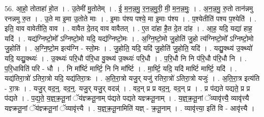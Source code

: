 \documentclass[17pt]{extarticle}
\begin{document}
56. आ॒हो॒ तोताहा॑ हो॒त । . उ॒तेमी॑ मु॒तोतेम् । . ई॒ म॒न॒न्न॒मु॒ र॒न॒न्न॒मु॒री॒ मी॒ म॒न॒न्न॒मुः॒ । . अ॒न॒न्न॒मु॒ रु॒तो तान॑न्नमु रनन्नमु रु॒त । . उ॒ते मा इ॒मा उ॒तोते माः । . इ॒माः प॑श्य पश्ये॒ मा इ॒माः प॑श्य । . प॒श्येतीति॑ पश्य प॒श्येति॑ । . इति॒ वाव वावेतीति॒ वाव । . वावैत दे॒तद् वाव वावैतत् । . ए॒त दा॑हा है॒त दे॒त दा॑ह । . आ॒ह॒ यदि॒ यद्या॑ हाह॒ यदि॑ । . यद्य॑ग्निष्टो॒मो᳚ ऽग्निष्टो॒मो यदि॒ यद्य॑ग्निष्टो॒मः । . अ॒ग्नि॒ष्टो॒मो जु॒होति॑ जु॒हो त्य॑ग्निष्टो॒मो᳚ ऽग्निष्टो॒मो जु॒होति॑ । . अ॒ग्नि॒ष्टो॒म इत्य॑ग्नि - स्तो॒मः । . जु॒होति॒ यदि॒ यदि॑ जु॒होति॑ जु॒होति॒ यदि॑ । . यद्यु॒क्थ्य॑ उ॒क्थ्यो॑ यदि॒ यद्यु॒क्थ्यः॑ । . उ॒क्थ्यः॑ परि॒धौ प॑रि॒धा वु॒क्थ्य॑ उ॒क्थ्यः॑ परि॒धौ । . प॒रि॒धौ नि नि प॑रि॒धौ प॑रि॒धौ नि । . प॒रि॒धाविति॑ परि - धौ । . नि मा᳚र्ष्टि मार्ष्टि॒ नि नि मा᳚र्ष्टि । . मा॒र्ष्टि॒ यदि॒ यदि॑ मार्ष्टि मार्ष्टि॒ यदि॑ । . यद्य॑तिरा॒त्रो॑ ऽतिरा॒त्रो यदि॒ यद्य॑तिरा॒त्रः । . अ॒ति॒रा॒त्रो यजु॒र् यजु॑ रतिरा॒त्रो॑ ऽतिरा॒त्रो यजुः॑ । . अ॒ति॒रा॒त्र इत्य॑ति - रा॒त्रः । . यजु॒र् वद॒न्॒. वद॒न्॒. यजु॒र् यजु॒र् वदन्न्॑ । . वद॒न् प्र प्र वद॒न्॒. वद॒न् प्र । . प्र प॑द्यते पद्यते॒ प्र प्र प॑द्यते । . प॒द्य॒ते॒ य॒ज्ञ्॒क्र॒तू॒नां ॅय॑ज्ञ्क्रतू॒नाम् प॑द्यते पद्यते यज्ञ्क्रतू॒नाम् । . य॒ज्ञ्॒क्र॒तू॒नां ॅव्यावृ॑त्त्यै॒ व्यावृ॑त्त्यै यज्ञ्क्रतू॒नां ॅय॑ज्ञ्क्रतू॒नां ॅव्यावृ॑त्त्यै । . य॒ज्ञ्॒क्र॒तू॒नामिति॑ यज्ञ् - क्र॒तू॒नाम् । . व्यावृ॑त्त्या॒ इति॑ वि - आवृ॑त्त्यै । \newline
\end{document}
